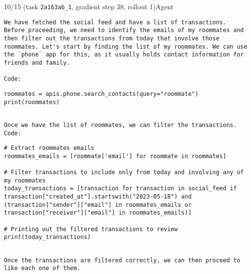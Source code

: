 \begin{minipage}{0.95\linewidth}
\begin{assistant_message_box}{{10/15 (task \texttt{2a163ab\_1}, gradient step 38, rollout 1)\hfill Agent}}
\scriptsize
\begin{Verbatim}[breaklines]
We have fetched the social feed and have a list of transactions. Before proceeding, we need to identify the emails of my roommates and then filter out the transactions from today that involve those roommates. Let's start by finding the list of my roommates. We can use the `phone` app for this, as it usually holds contact information for friends and family.

Code:
\end{Verbatim}
\begin{tcolorbox}[colback=codebgcolor,boxrule=0pt]\begin{Verbatim}[breaklines]
roommates = apis.phone.search_contacts(query="roommate")
print(roommates)

\end{Verbatim}
\end{tcolorbox}\begin{Verbatim}[breaklines]

Once we have the list of roommates, we can filter the transactions.
Code:
\end{Verbatim}
\begin{tcolorbox}[colback=codebgcolor,boxrule=0pt]\begin{Verbatim}[breaklines]
# Extract roommates emails
roommates_emails = [roommate['email'] for roommate in roommates]

# Filter transactions to include only from today and involving any of my roommates
today_transactions = [transaction for transaction in social_feed if transaction["created_at"].startswith("2023-05-18") and (transaction["sender"]["email"] in roommates_emails or transaction["receiver"]["email"] in roommates_emails)]

# Printing out the filtered transactions to review
print(today_transactions)

\end{Verbatim}
\end{tcolorbox}\begin{Verbatim}[breaklines]

Once the transactions are filtered correctly, we can then proceed to like each one of them.
\end{Verbatim}
\end{assistant_message_box}
\end{minipage}

